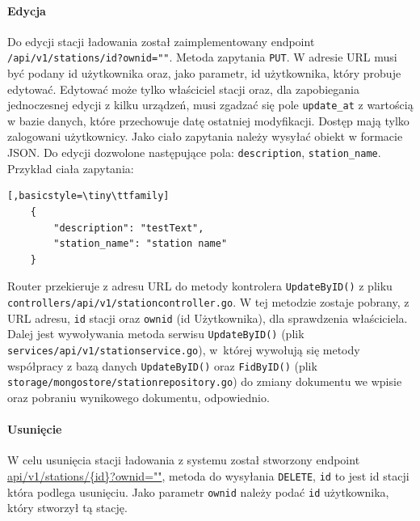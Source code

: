 \paragraph{Edycja\newline}
Do edycji stacji ładowania został zaimplementowany endpoint \texttt{/api/v1/stations/{id}?ownid=""}.
Metoda zapytania \texttt{PUT}.
W adresie URL musi być podany id użytkownika oraz, jako parametr, id użytkownika, który probuje edytować. Edytować może tylko właściciel stacji oraz, dla zapobiegania jednoczesnej edycji z kilku urządzeń, musi zgadzać się pole \texttt{update\_at} z wartością w bazie danych, które przechowuje datę ostatniej modyfikacji.
Dostęp mają tylko zalogowani użytkownicy.
Jako ciało zapytania należy wysyłać obiekt w formacie JSON. Do edycji dozwolone następujące pola: \texttt{description}, \texttt{station\_name}.
Przykład ciała zapytania:
\begin{lstlisting}[,basicstyle=\tiny\ttfamily]
    {
		"description": "testText",
		"station_name": "station name"
    }
\end{lstlisting}

Router przekieruje z adresu URL do metody kontrolera \texttt{UpdateByID()} z pliku \texttt{controllers/api/v1/stationcontroller.go}.
W tej metodzie zostaje pobrany, z URL adresu, \texttt{id} stacji oraz \texttt{ownid} (id Użytkownika), dla sprawdzenia właściciela.
Dalej jest wywoływania metoda serwisu \texttt{UpdateByID()} (plik \texttt{services/api/v1/stationservice.go}), w~której wywołują się metody współpracy z bazą danych \texttt{UpdateByID()} oraz \texttt{FidByID()} (plik \texttt{storage/mongostore/stationrepository.go}) do zmiany dokumentu we wpisie oraz pobraniu wynikowego dokumentu, odpowiednio.


\paragraph{Usunięcie\newline}
W celu usunięcia stacji ładowania z systemu został stworzony endpoint \url{api/v1/stations/{id}?ownid=""}, metoda do wysyłania \texttt{DELETE}, \texttt{{id}} to jest id stacji która podlega usunięciu. Jako parametr \texttt{ownid} należy podać \texttt{id} użytkownika, który stworzył tą stację.

